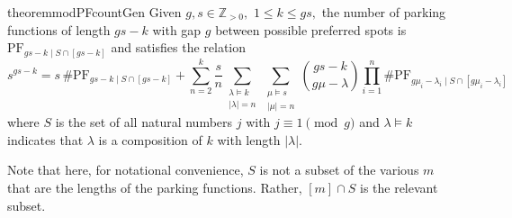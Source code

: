 \documentclass[12pt]{article}
\begin{document}
\begin{restatable}{theorem}{modPFcountGen}
	Given $g,s\in\mathbb{Z}_{>0},$ $1\le k\le gs,$ the number of parking functions of length $gs - k$ with gap $g$ between possible preferred spots is $\mathrm{PF}_{gs - k \mid S \cap [gs - k]}$ and satisfies the relation
	\[
		s^{gs - k} = s \, \# \mathrm{PF}_{gs - k \mid S \cap [gs - k]} + \sum_{n = 2}^{k} \frac{s}{n} \sum_{\substack{\lambda \vDash k \\ \lvert\lambda\rvert = n}} \sum_{\substack{\mu \vDash s \\\lvert \mu \rvert = n}} \binom{gs - k}{g \mu - \lambda} \prod_{i = 1}^{n} \# \mathrm{PF}_{g \mu_{i} - \lambda_{i} \mid S \cap [g \mu_{i} - \lambda_{i}]}
	\]
	where $S$ is the set of all natural numbers $j$ with $j \equiv 1 \pmod g$ and $\lambda \vDash k$ indicates that $\lambda$ is a composition of $k$ with length $|\lambda|.$
\end{restatable}

Note that here, for notational convenience, $S$ is not a subset of the various $m$ that are the lengths of the parking functions. Rather, $[m] \cap S$ is the relevant subset. 
\end{document}
